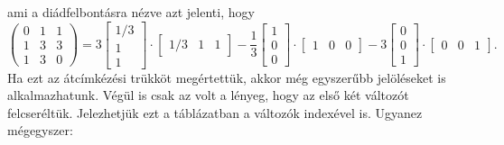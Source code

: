 \documentclass[9pt, a4paper, showtrims]{memoir}
\theoremstyle{plain}
\theoremstyle{remark}
\theoremstyle{definition}
\begin{document}
ami a diádfelbontásra nézve azt jelenti, hogy
\[
    \begin{pmatrix}
        0&1&1\\
        1&3&3\\
        1&3&0
    \end{pmatrix}
    =
    3
    \begin{bmatrix}
        1/3\\1\\1
    \end{bmatrix}
    \cdot
    \begin{bmatrix}
        1/3&1&1
    \end{bmatrix}
    -\frac{1}{3}
    \begin{bmatrix}
        1\\0\\0
    \end{bmatrix}
    \cdot
    \begin{bmatrix}
        1&0&0
    \end{bmatrix}
    -3
    \begin{bmatrix}
        0\\0\\1
    \end{bmatrix}
    \cdot
    \begin{bmatrix}
        0&0&1
    \end{bmatrix}.
\]
Ha ezt az átcímkézési trükköt megértettük, akkor még egyszerűbb jelöléseket is alkalmazhatunk.
Végül is csak az volt a lényeg, hogy az első két változót felcseréltük. 
Jelezhetjük ezt a táblázatban a változók indexével is. 
Ugyanez mégegyszer:
\end{document}
